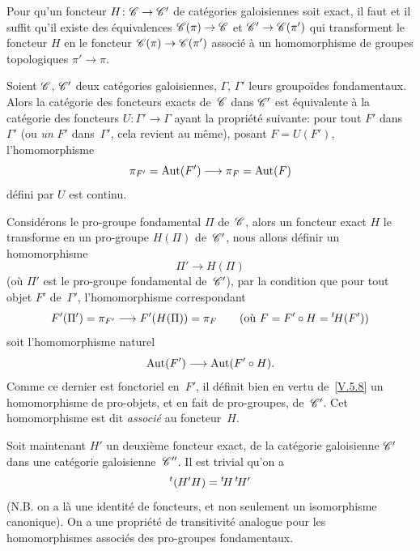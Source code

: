 \begin{corollaire}
\label{V.6.2}
Pour
qu'un foncteur $H\colon \cal{C} \to \cal{C'}$ de cat\'egories
galoisiennes soit exact, il faut et il suffit qu'il existe des
\'equivalences $\cal{C}(\pi)\to\cal{C}$ et
$\cal{C'}\to\cal{C}(\pi')$
qui transforment le foncteur $H$ en le foncteur
$\cal{C}(\pi)\to\cal{C}(\pi')$ associ\'e \`a un homomorphisme de
groupes topologiques $\pi'\to\pi$.
\end{corollaire}

\begin{corollaire}
\label{V.6.3}
Soient $\cal{C}$, $\cal{C'}$ deux cat\'egories galoisiennes,
$\Gamma$, $\Gamma'$ leurs groupo\"ides fondamentaux. Alors la
cat\'egorie des foncteurs exacts de~$\cal{C}$ dans $\cal{C'}$ est
\'equivalente \`a la cat\'egorie des foncteurs $U\colon \Gamma'
\to \Gamma$ ayant la propri\'et\'e suivante: pour tout $F'$ dans~$\Gamma'$ (ou \emph{un} $F'$ dans~$\Gamma'$, cela revient au
m\^eme), posant $F=U(F')$, l'homomorphisme
$$
\pi_{F'} =\Aut (F')\to \pi_F =\Aut (F)
$$
d\'efini par $U$ est continu.
\end{corollaire}

Consid\'erons le pro-groupe fondamental $\Pi$ de~$\cal{C}$, alors un
foncteur exact $H$ le transforme en un pro-groupe $H(\Pi)$
de~$\cal{C'}$, nous allons d\'efinir un homomorphisme
$$
\Pi' \to H(\Pi)
$$
(o\`u $\Pi'$ est le pro-groupe fondamental de~$\cal{C'}$), par la
condition que pour tout objet $F'$ de~$\Gamma'$, l'homomorphisme
correspondant
$$
F' (\Pi')=\pi_{F'} \to F' (H(\Pi))=\pi_F \qquad
\text{(où $F=F'\circ H=\tH(F')$)}
$$
soit l'homomorphisme naturel
$$
\Aut(F')\to \Aut(F' \circ H).
$$
Comme ce dernier est fonctoriel en~$F'$, il d\'efinit bien en vertu
de~\ref{V.5.8} un homomorphisme de pro-objets, et en fait de
pro-groupes, de~$\cal{C'}$. Cet homomorphisme est dit
\emph{associé} au foncteur~$H$.

Soit maintenant $H'$ un deuxi\`eme foncteur exact, de la
cat\'egorie galoisienne $\cal{C'}$ dans une cat\'egorie
galoisienne~$\cal{C''}$. Il est trivial qu'on a
$$
{}^t (H' H)={}^t\!H\,{}^t\!H'
$$
(N.B. on a l\`a une identit\'e de foncteurs, et non seulement un
isomorphisme canonique). On a une propri\'et\'e de
transitivit\'e analogue pour les homomorphismes associ\'es des
pro-groupes fondamentaux.

